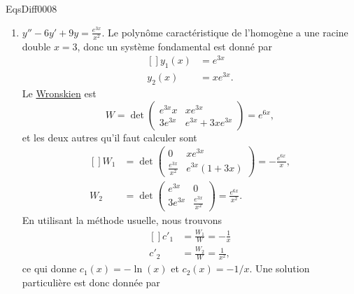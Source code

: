 
\begin{corrige}{EqsDiff0008}

\begin{enumerate}

\item
$y''-6y'+9y=\frac{  e^{3x} }{ x^2 }$. Le polynôme caractéristique de l'homogène a une racine double $x=3$, donc un système fondamental est donné par
\begin{equation}
	\begin{aligned}[]
		y_1(x)&= e^{3x}\\
		y_2(x)&= xe^{3x}.
	\end{aligned}
\end{equation}
Le \href{http://fr.wikipedia.org/wiki/Wronskien}{Wronskien} est
\begin{equation}
	W=\det\begin{pmatrix}
	 e^{3x}x &	x e^{3x}	\\ 
	3 e^{3x}	&	 e^{3x}+3x e^{3x}
\end{pmatrix}= e^{6x},
\end{equation}
et les deux autres qu'il faut calculer sont
\begin{equation}
	\begin{aligned}[]
		W_1&=\det\begin{pmatrix}
	0	&	x e^{3x}	\\ 
	\frac{  e^{3x} }{ x^2 }	&	 e^{3x}(1+3x)	
\end{pmatrix}=-\frac{  e^{6x} }{ x },\\
		W_2&=\det\begin{pmatrix}
	 e^{3x}	&	0	\\ 
	3 e^{3x}	&	\frac{  e^{3x} }{ x^2 }
\end{pmatrix}=\frac{  e^{6x} }{ x^2 }.
	\end{aligned}
\end{equation}
En utilisant la méthode usuelle, nous trouvons	
\begin{equation}
	\begin{aligned}[]
		c'_1&=\frac{ W_1 }{ W }=-\frac{1}{ x }\\
		c'_2&=\frac{ W_2 }{ W }=\frac{1}{ x^2 },
	\end{aligned}
\end{equation}
ce qui donne $c_1(x)=-\ln(x)$ et $c_2(x)=-1/x$. Une solution particulière est donc donnée par
\begin{equation}

\end{equation}
\end{enumerate}
\end{corrige}
